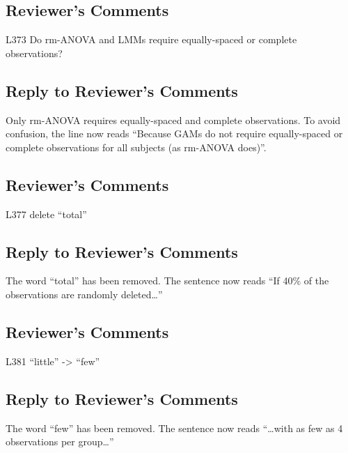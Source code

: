 \documentclass[
]{article}
\begin{document}
\hypertarget{reviewers-comments-28}{%
\subsection{Reviewer's Comments}\label{reviewers-comments-28}}

L373 Do rm-ANOVA and LMMs require equally-spaced or complete observations?

\hypertarget{section-28}{%
\subsection{\texorpdfstring{\textcolor{reviewersblue} {Reply to Reviewer's Comments}}{}}\label{section-28}}

Only rm-ANOVA requires equally-spaced and complete observations. To avoid confusion, the line now reads ``Because GAMs do not require equally-spaced or complete observations for all subjects (as rm-ANOVA does)''.

\hypertarget{reviewers-comments-29}{%
\subsection{Reviewer's Comments}\label{reviewers-comments-29}}

L377 delete ``total''

\hypertarget{section-29}{%
\subsection{\texorpdfstring{\textcolor{reviewersblue} {Reply to Reviewer's Comments}}{}}\label{section-29}}

The word ``total'' has been removed. The sentence now reads ``If 40\% of the observations are randomly deleted\ldots{}''

\hypertarget{reviewers-comments-30}{%
\subsection{Reviewer's Comments}\label{reviewers-comments-30}}

L381 ``little'' -\textgreater{} ``few''

\hypertarget{section-30}{%
\subsection{\texorpdfstring{\textcolor{reviewersblue} {Reply to Reviewer's Comments}}{}}\label{section-30}}

The word ``few'' has been removed. The sentence now reads ``\ldots with as few as 4 observations per group\ldots{}''
\end{document}
